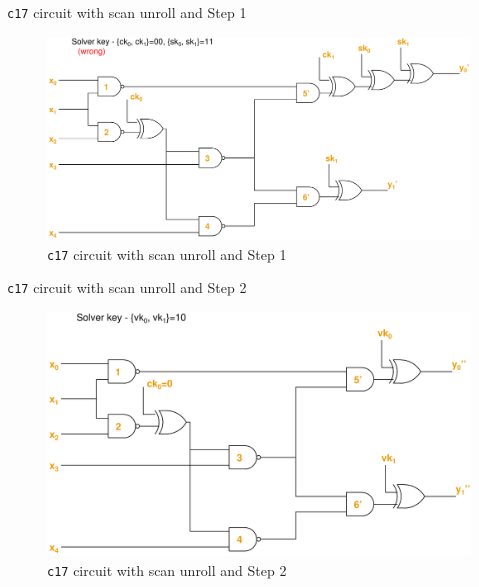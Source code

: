\begin{frame}{\texttt{c17} circuit with scan unroll and Step 1}
       \begin{figure}
                \begin{center}
                \label{fig:c17-s-l-Algo-Step1}
                \caption{\texttt{c17} circuit with scan unroll and Step 1}
                        \includegraphics[scale=0.3]{fig/c17_sequentially_locked_scan_unrolled_Algo_Step1.pdf}
                \end{center}
        \end{figure}
\end{frame}

\begin{frame}{\texttt{c17} circuit with scan unroll and Step 2}
       \begin{figure}
                \begin{center}
                \label{fig:c17-s-l-Algo-Step2}
                \caption{\texttt{c17} circuit with scan unroll and Step 2}
                        \includegraphics[scale=0.3]{fig/c17_sequentially_locked_scan_unrolled_Algo_Step2.pdf}
                \end{center}
        \end{figure}
\end{frame}

